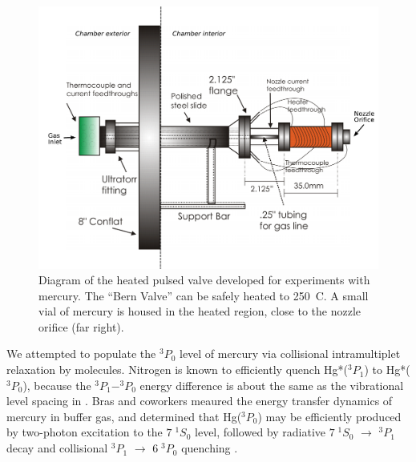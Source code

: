 \begin{figure}
  \caption{Diagram of the heated pulsed valve developed for
    experiments with mercury.  The ``Bern Valve'' can be safely heated
    to 250\degrees\ C.  A small vial of mercury is housed in the
    heated region, close to the nozzle orifice (far right).}
  \label{fig:bern-diagram}
  \centering
  \vspace{1cm}
  \includegraphics[width=6.3in, trim=1cm 0 0 0]{bern-diagram.pdf}
  \vspace{1in}
\end{figure}

We attempted to populate the $^3P_0$ level of mercury via collisional
intramultiplet relaxation by  molecules.  Nitrogen is known to
efficiently quench Hg*($^3P_1$) to Hg*($^3P_0$), because the
$^3P_1-^3P_0$ energy difference is about the same as the vibrational
level spacing in  \cite{callear70, horiguchi71, mitchell61}.
Bras and coworkers meaured the energy transfer dynamics of mercury in
 buffer gas, and determined that Hg($^3P_0$) may be efficiently
produced by two-photon excitation to the $7 \; ^1S_0$ level, followed
by radiative $7 \; ^1S_0$ $\rightarrow$ $^3P_1$ decay and collisional
$^3P_1$ $\rightarrow$ $6 \; ^3P_0$ quenching \cite{bras93}.

